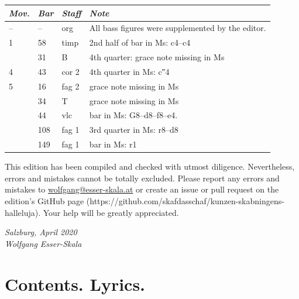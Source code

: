 \documentclass[parskip=full]{scrreprt}
\begin{document}
\bigskip


\begin{longtable}{lll L{10cm}}
	\toprule
	\itshape Mov. & \itshape Bar & \itshape Staff & \itshape Note \\
	\midrule \endhead
	–  & –   & org   & All bass figures were supplemented by the editor. \\
	1  & 58  & timp  & 2nd half of bar in Ms: c4–c4 \\
	   & 31  & B     & 4th quarter: grace note missing in Ms \\
	4  & 43  & cor 2 & 4th quarter in Ms: c″4 \\
	5  & 16  & fag 2 & grace note missing in Ms \\
	   & 34  & T     & grace note missing in Ms \\
	   & 44  & vlc   & bar in Ms: G8–d8–f8–e4. \\
	   & 108 & fag 1 & 3rd quarter in Ms: r8–d8 \\
	   & 149 & fag 1 & bar in Ms: r1 \\
	\bottomrule
\end{longtable}


This edition has been compiled and checked with utmost diligence. Nevertheless, errors and mistakes cannot be totally excluded. Please report any errors and mistakes to \url{wolfgang@esser-skala.at} or create an issue or pull request on the edition’s GitHub page (https://github.com/skafdasschaf/kunzen-skabningens-halleluja). Your help will be greatly appreciated.

\bigskip
\textit{Salzburg, April 2020\\
Wolfgang Esser-Skala}




\chapter*{Contents. Lyrics.}
\end{document}
